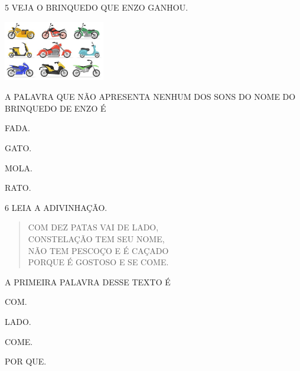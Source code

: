 \num{5} VEJA O BRINQUEDO QUE ENZO GANHOU.

\includegraphics[width=1.73681in,height=1.03125in]{media/image245.jpg}


A PALAVRA QUE NÃO APRESENTA NENHUM DOS SONS DO NOME DO BRINQUEDO DE ENZO É

\begin{escolha}
\item FADA.

\item GATO.

\item MOLA.

\item RATO.
\end{escolha}


\num{6} LEIA A ADIVINHAÇÃO. 

\begin{verse}
COM DEZ PATAS VAI DE LADO,\\
CONSTELAÇÃO TEM SEU NOME,\\
NÃO TEM PESCOÇO E É CAÇADO\\
PORQUE É GOSTOSO E SE COME.
\end{verse}


A PRIMEIRA PALAVRA DESSE TEXTO É

\begin{escolha}
\item COM.

\item LADO.

\item COME.

\item POR QUE.
\end{escolha}

